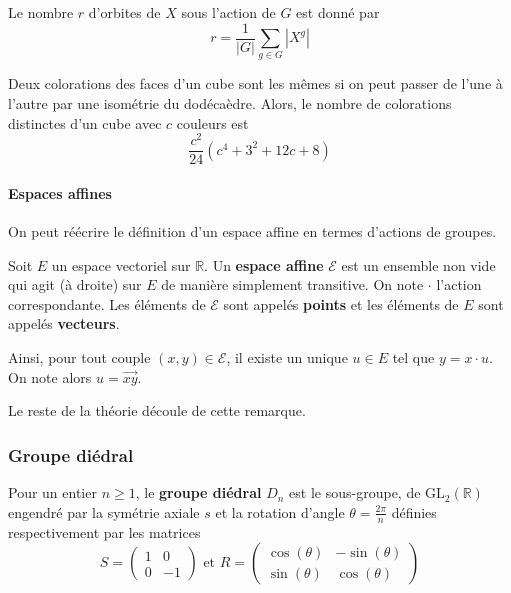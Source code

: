  \begin{theorem}
    Le nombre $r$ d'orbites de $X$ sous l'action de $G$ est donné par
    \[ r = \frac{1}{|G|} \sum_{g \in G} |X^g| \]
  \end{theorem}


  \begin{application}
    Deux colorations des faces d'un cube sont les mêmes si on peut passer de l'une à l'autre par une isométrie du dodécaèdre. Alors, le nombre de colorations distinctes d'un cube avec $c$ couleurs est
    \[ \frac{c^2}{24} (c^4 + 3^2 + 12c + 8) \]
  \end{application}

  \paragraph{Espaces affines}


  On peut réécrire le définition d'un espace affine en termes d'actions de groupes.

  \begin{definition}
    Soit $E$ un espace vectoriel sur $\mathbb{R}$. Un \textbf{espace affine} $\mathcal{E}$ est un ensemble non vide qui agit (à droite) sur $E$ de manière simplement transitive. On note $\cdot$ l'action correspondante. Les éléments de $\mathcal{E}$ sont appelés \textbf{points} et les éléments de $E$ sont appelés \textbf{vecteurs}.
  \end{definition}

  \begin{remark}
    Ainsi, pour tout couple $(x,y) \in \mathcal{E}$, il existe un unique $u \in E$ tel que $y = x \cdot u$. On note alors $u = \overrightarrow{xy}$.
  \end{remark}

  Le reste de la théorie découle de cette remarque.

  \subsubsection{Groupe diédral}


  \begin{definition}
    Pour un entier $n \geq 1$, le \textbf{groupe diédral} $D_n$ est le sous-groupe, de $\mathrm{GL}_2(\mathbb{R})$ engendré par la symétrie axiale $s$ et la rotation d'angle $\theta = \frac{2\pi}{n}$ définies respectivement par les matrices
    \[
    S =
    \begin{pmatrix}
      1 & 0 \\
      0 & -1
    \end{pmatrix}
    \text{ et }
    R =
    \begin{pmatrix}
      \cos(\theta) & -\sin(\theta) \\
      \sin(\theta) & \cos(\theta)
    \end{pmatrix}
    \]
  \end{definition}

